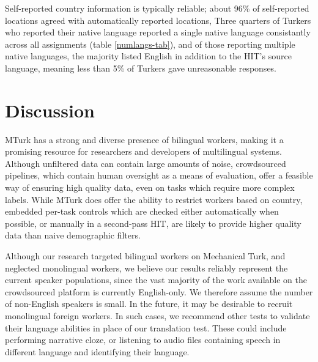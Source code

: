 \documentclass[11pt]{article}
\begin{document}
Self-reported country information is typically reliable; about 96\% of self-reported locations agreed with automatically reported locations, 
Three quarters of Turkers who reported their native language reported a single native language consistantly across all assignments (table \ref{numlangs-tab}), and of those reporting multiple native languages, the majority listed English in addition to the HIT's source language, meaning less than 5\% of Turkers gave unreasonable responses.  

\section{Discussion}
MTurk has a strong and diverse presence of bilingual workers, making it a promising resource for researchers and developers of multilingual systems. Although unfiltered data can contain large amounts of noise, crowdsourced pipelines, which contain human oversight as a means of evaluation, offer a feasible way of ensuring high quality data, even on tasks which require more complex labels. While MTurk does offer the ability to restrict workers based on country, embedded per-task controls which are checked either automatically when possible, or manually in a second-pass HIT, are likely to provide higher quality data than naive demographic filters. 

Although our research targeted bilingual workers on Mechanical Turk, and neglected monolingual workers, we believe our results reliably represent the current speaker populations, since the vast majority of the work available on the crowdsourced platform is currently English-only.  We therefore assume the number of non-English speakers is small.  In the future, it may be desirable to recruit monolingual foreign workers.  In such cases, we recommend other tests to validate their language abilities in place of our translation test.  These could include performing narrative cloze, or listening to audio files containing speech in different language and identifying their language. 




\end{document}
